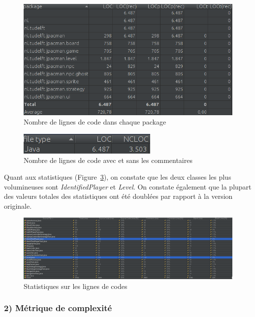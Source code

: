 \documentclass[12pt, openany]{report}
\begin{document}
\begin{figure}[!h]
	\centering
	\includegraphics[scale=0.6]{Images/SizeMetricsLOCFinal.png} 
	\caption{Nombre de lignes de code dans chaque package}
	\label{locfinal}
\end{figure}
\begin{figure}[!h]
	\centering
	\includegraphics[scale=0.6]{Images/SizeMetricsLOCFinal2.png} 
	\caption{Nombre de lignes de code avec et sans les commentaires}
	\label{locfinal2}
\end{figure}
\newpage
Quant aux statistiques (Figure~\ref{locfinal3}), on constate que les deux classes les plus volumineuses sont \mbox{\textit{IdentifiedPlayer}} et  \mbox{\textit{Level}}. On constate également que la plupart des valeurs totales des statistiques ont été doublées par rapport à la version originale.


\begin{figure}[!h]
	\centering
	\includegraphics[scale=0.29]{Images/SizeMetricsLOCFinal3.png} 
	\caption{Statistiques sur les lignes de codes}
	\label{locfinal3}
\end{figure}
\subsubsection*{\textbf{\large{2) Métrique de complexité}}}
\end{document}

